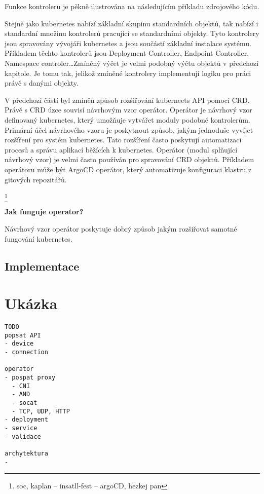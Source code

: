 Funkce kontroleru je pěkně ilustrována na následujícím příkladu zdrojového kódu.\cite{nguyen_2017_a}


Stejně jako kubernetes nabízí základní skupinu standardních objektů, tak nabízí i standardní množinu kontrolerů pracující se standardními objekty. Tyto kontrolery jsou spravovány vývojáři kubernetes a jsou součástí základní instalace systému. Příkladem těchto kontrolerů jsou Deployment Controller, Endpoint Controller, Namespace controler\ldots Zmíněný výčet je velmi podobný výčtu objektů v předchozí kapitole. Je tomu tak, jelikož zmíněné kontrolery implementují logiku pro práci právě s danými objekty.

V předchozí částí byl zmíněn způsob rozšiřování kuberneets API pomocí CRD. Právě s CRD úzce souvisí návrhovým vzor operátor. Operátor je návrhový vzor definovaný kubernetes, který umožňuje vytvářet moduly podobné kontrolerům. Primární účel návrhového vzoru je poskytnout způsob, jakým jednoduše vyvíjet rozšíření pro systém kubernetes. Tato rozšíření často poskytují automatizaci procesů a správu aplikací běžících k kubernetes. Operátor (modul splňující návrhový vzor) je velmi často používán pro spravování CRD objektů. Příkladem operátoru může být ArgoCD operátor, který automatizuje konfiguraci klastru z gitových repozitářů.


\footnote{soc, kaplan -- insatll-fest -- argoCD, hezkej pan}\cite{velichko_2021_exploring}

\textbf{Jak funguje operator?}

Návrhový vzor operátor poskytuje dobrý způsob jakým rozšiřovat samotné fungování kubernetes.
\subsection{Implementace}
\section{Ukázka}



\begin{verbatim}
TODO
popsat API
- device
- connection

operator
- pospat proxy
  - CNI
  - AND
  - socat
  - TCP, UDP, HTTP
- deployment
- service
- validace

archytektura
- 
\end{verbatim}